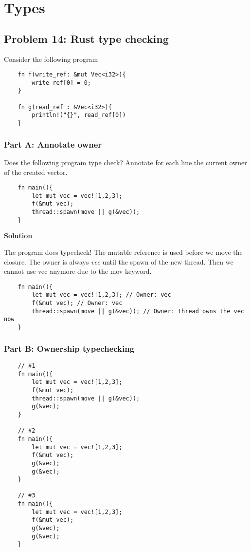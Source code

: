 \section{Types}

\subsection{Problem 14: Rust type checking}

Consider the following program

\begin{lstlisting}
    fn f(write_ref: &mut Vec<i32>){
        write_ref[0] = 0;
    }

    fn g(read_ref : &Vec<i32>){
        println!("{}", read_ref[0])
    }
\end{lstlisting}

\subsubsection{Part A: Annotate owner}

Does the following program type check? Annotate for each line the current owner of the created vector. 

\begin{lstlisting}
    fn main(){
        let mut vec = vec![1,2,3];
        f(&mut vec);
        thread::spawn(move || g(&vec));
    }
\end{lstlisting}

\textbf{Solution}

The program does typecheck! The mutable reference is used before we move the closure. 
The owner is always \textit{vec} until the spawn of the new thread. Then we cannot use vec anymore due to the mov keyword. 

\begin{lstlisting}
    fn main(){
        let mut vec = vec![1,2,3]; // Owner: vec
        f(&mut vec); // Owner: vec
        thread::spawn(move || g(&vec)); // Owner: thread owns the vec now
    }
\end{lstlisting}


\subsubsection{Part B: Ownership typechecking}

\begin{lstlisting}
    // #1
    fn main(){
        let mut vec = vec![1,2,3];
        f(&mut vec);
        thread::spawn(move || g(&vec));
        g(&vec);
    }

    // #2
    fn main(){
        let mut vec = vec![1,2,3];
        f(&mut vec);
        g(&vec);
        g(&vec);
    }

    // #3
    fn main(){
        let mut vec = vec![1,2,3];
        f(&mut vec);
        g(&vec);
        g(&vec);
    }
\end{lstlisting}

